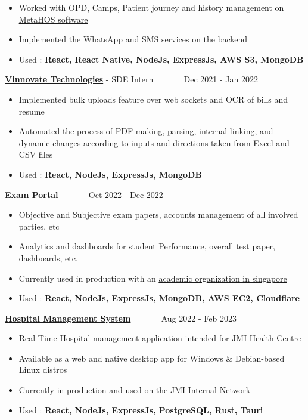 \documentclass[10pt,a4paper,ragged2e,withhyper]{altacv}
\begin{document}
\begin{paracol}{2}
\begin{itemize}
  \item Worked with OPD, Camps, Patient journey and history management on \href{https://metahos.com/}{\underline{MetaHOS software}} 
  \item Implemented the WhatsApp and SMS services on the backend
  \item Used : \textcolor{VividPurple}{\textbf{React, React Native, NodeJs, ExpressJs, AWS S3, MongoDB }}
\end{itemize}

\divider

\large \textcolor{VividPurple}{\href{https://vinnovatetechnologies.com}{\textbf{Vinnovate Technologies}}} - SDE Intern ~~~~~~ \normalsize \faCalendar Dec 2021 - Jan 2022

\begin{itemize}
  \item Implemented bulk uploads feature over web sockets and OCR of bills and resume
  \item Automated the process of PDF making, parsing, internal linking, and dynamic changes according to inputs and directions taken from Excel and CSV files
  \item Used : \textcolor{VividPurple}{\textbf{React, NodeJs, ExpressJs, MongoDB }}
\end{itemize}


\large \textcolor{VividPurple}{\href{https://github.com/m3rashid/exam-portal}{\textbf{Exam Portal}}} ~~~~~~ \normalsize \faCalendar Oct 2022 - Dec 2022
\begin{itemize}
  \item Objective and Subjective exam papers, accounts management of all involved parties, etc 
  \item Analytics and dashboards for student Performance, overall test paper, dashboards,  etc.
  \item Currently used in production with an \href{http://leagueonline.sg}{\underline{academic organization in singapore}}
  \item Used : \textcolor{VividPurple}{\textbf{React, NodeJs, ExpressJs, MongoDB, AWS EC2, Cloudflare }}
\end{itemize}

\divider

\large \textcolor{VividPurple}{\href{}{\textbf{Hospital Management System}}} ~~~~~~ \normalsize \faCalendar Aug 2022 - Feb 2023
\begin{itemize}
  \item Real-Time Hospital management application intended for JMI Health Centre
  \item Available as a web and native desktop app for Windows \& Debian-based Linux distros
  \item Currently in production and used on the JMI Internal Network
  \item Used : \textcolor{VividPurple}{\textbf{React, NodeJs, ExpressJs, PostgreSQL, Rust, Tauri }}
\end{itemize}


\end{paracol}
\end{document}
